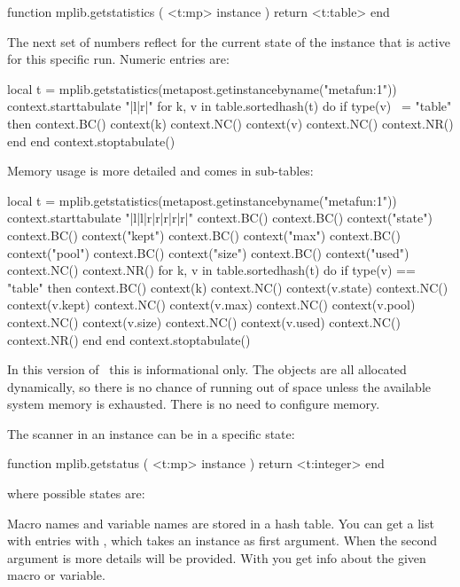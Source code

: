 \starttyping[option=LUA]
function mplib.getstatistics ( <t:mp> instance )
    return <t:table>
end
\stoptyping

The next set of numbers reflect for the current state of the 
instance that is active for this specific run. Numeric entries are:

\startthreerows
\startluacode
local t = mplib.getstatistics(metapost.getinstancebyname("metafun:1"))
context.starttabulate { "|l|r|" }
    for k, v in table.sortedhash(t) do
        if type(v) ~= "table" then
            context.BC() context(k)
            context.NC() context(v)
            context.NC() context.NR()
        end
    end
context.stoptabulate()
\stopluacode
\stopthreerows

Memory usage is more detailed and comes in sub-tables:

\startluacode
local t = mplib.getstatistics(metapost.getinstancebyname("metafun:1"))
context.starttabulate { "|l|l|r|r|r|r|r|" }
    context.BC()
    context.BC() context("state")
    context.BC() context("kept")
    context.BC() context("max")
    context.BC() context("pool")
    context.BC() context("size")
    context.BC() context("used")
    context.NC() context.NR()
    for k, v in table.sortedhash(t) do
        if type(v) == "table" then
            context.BC() context(k)
            context.NC() context(v.state)
            context.NC() context(v.kept)
            context.NC() context(v.max)
            context.NC() context(v.pool)
            context.NC() context(v.size)
            context.NC() context(v.used)
            context.NC() context.NR()
        end
    end
context.stoptabulate()
\stopluacode

In this version of \MPLIB\ this is informational only. The objects are all
allocated dynamically, so there is no chance of running out of space unless the
available system memory is exhausted. There is no need to configure memory.

The scanner in an instance can be in a specific state:

\starttyping[option=LUA]
function mplib.getstatus ( <t:mp> instance )
    return <t:integer>
end
\stoptyping

where possible states are:

\startfourrows
\stopfourrows

Macro names and variable names are stored in a hash table. You can get a list
with entries with , which takes an instance as first
argument. When the second argument is  more details will be provided.
With  you get info about the given macro or variable.


